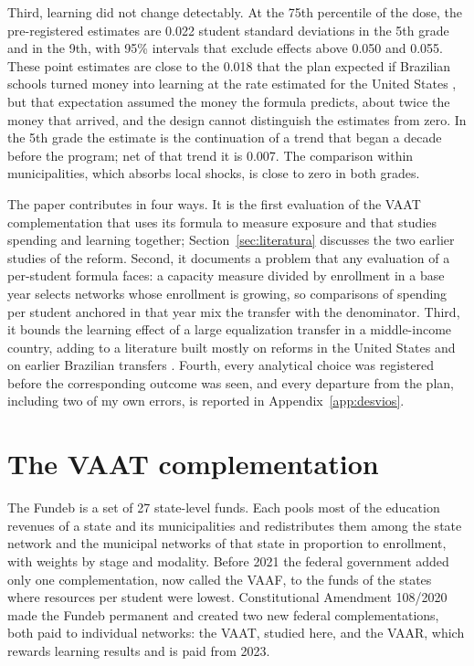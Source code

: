 \documentclass[12pt,letterpaper]{article}
\begin{document}
Third, learning did not change detectably. At the 75th percentile of the dose, the pre-registered estimates are 0.022 student standard deviations in the 5th grade and in the 9th, with 95\% intervals that exclude effects above 0.050 and 0.055. These point estimates are close to the 0.018 that the plan expected if Brazilian schools turned money into learning at the rate estimated for the United States \citep{jackson2024}, but that expectation assumed the money the formula predicts, about twice the money that arrived, and the design cannot distinguish the estimates from zero. In the 5th grade the estimate is the continuation of a trend that began a decade before the program; net of that trend it is 0.007. The comparison within municipalities, which absorbs local shocks, is close to zero in both grades.

The paper contributes in four ways. It is the first evaluation of the VAAT complementation that uses its formula to measure exposure and that studies spending and learning together; Section~\ref{sec:literatura} discusses the two earlier studies of the reform. Second, it documents a problem that any evaluation of a per-student formula faces: a capacity measure divided by enrollment in a base year selects networks whose enrollment is growing, so comparisons of spending per student anchored in that year mix the transfer with the denominator. Third, it bounds the learning effect of a large equalization transfer in a middle-income country, adding to a literature built mostly on reforms in the United States \citep{jackson2016,lafortune2018,jackson2024} and on earlier Brazilian transfers \citep{menezes2007,litschig2013}. Fourth, every analytical choice was registered before the corresponding outcome was seen, and every departure from the plan, including two of my own errors, is reported in Appendix~\ref{app:desvios}.

\section{The VAAT complementation}\label{sec:politica}

The Fundeb is a set of 27 state-level funds. Each pools most of the education revenues of a state and its municipalities and redistributes them among the state network and the municipal networks of that state in proportion to enrollment, with weights by stage and modality. Before 2021 the federal government added only one complementation, now called the VAAF, to the funds of the states where resources per student were lowest. Constitutional Amendment 108/2020 made the Fundeb permanent and created two new federal complementations, both paid to individual networks: the VAAT, studied here, and the VAAR, which rewards learning results and is paid from 2023.
\end{document}
